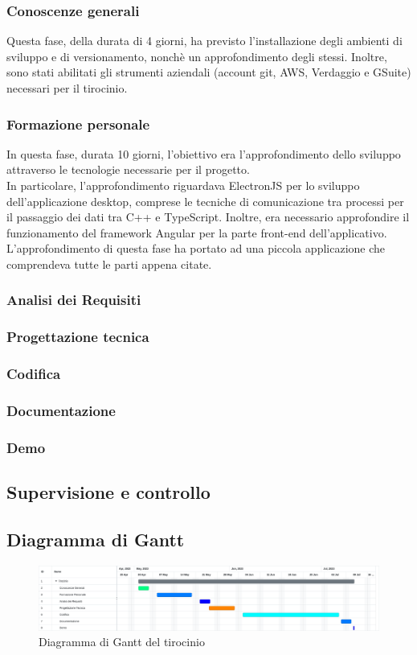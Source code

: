 \subsubsection{Conoscenze generali}
Questa fase, della durata di 4 giorni, ha previsto l'installazione degli ambienti di sviluppo e di versionamento, nonchè un approfondimento degli stessi. Inoltre, sono stati abilitati gli strumenti aziendali (account git, AWS, Verdaggio e GSuite) necessari per il tirocinio.
\subsubsection{Formazione personale}
In questa fase, durata 10 giorni, l'obiettivo era l'approfondimento dello sviluppo attraverso le tecnologie necessarie per il progetto.\\
In particolare, l'approfondimento riguardava ElectronJS per lo sviluppo dell'applicazione desktop, comprese le tecniche di comunicazione tra processi per il passaggio dei dati tra C++ e TypeScript. Inoltre, era necessario approfondire il funzionamento del framework Angular per la parte front-end dell'applicativo.\\
L'approfondimento di questa fase ha portato ad una piccola applicazione che comprendeva tutte le parti appena citate.
\subsubsection{Analisi dei Requisiti}
\subsubsection{Progettazione tecnica}
\subsubsection{Codifica}
\subsubsection{Documentazione}
\subsubsection{Demo}

\subsection{Supervisione e controllo}

\subsection{Diagramma di Gantt}
\begin{figure}[!h] 
    \centering 
    \includegraphics[width=350pt]{images/diagrammaGantt.png} 
    \caption{Diagramma di Gantt del tirocinio}
\end{figure}

